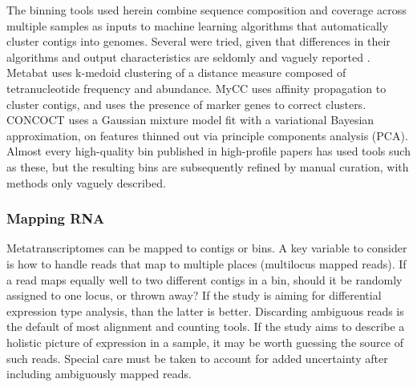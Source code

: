 The binning tools used herein combine sequence composition and coverage across multiple samples as inputs to machine learning algorithms that automatically cluster contigs into genomes.
Several were tried, given that differences in their algorithms and output characteristics are seldomly and vaguely reported \cite{sangwan2016}.
Metabat \cite{metabat2015} uses k-medoid clustering of a distance measure composed of tetranucleotide frequency and abundance.
MyCC \cite{mycc2016} uses affinity propagation to cluster contigs, and uses the presence of marker genes to correct clusters.
CONCOCT \cite{concoct2014} uses a Gaussian mixture model fit with a variational Bayesian approximation, on features thinned out via principle components analysis (PCA).
Almost every high-quality bin published in high-profile papers has used tools such as these, but the resulting bins are subsequently refined by manual curation, with methods only vaguely described.

\subsubsection{Mapping RNA}   %
Metatranscriptomes can be mapped to contigs or bins.
A key variable to consider is how to handle reads that map to multiple places (multilocus mapped reads).
If a read maps equally well to two different contigs in a bin, should it be randomly assigned to one locus, or thrown away?
If the study is aiming for differential expression type analysis, than the latter is better.
Discarding ambiguous reads is the default of most alignment and counting tools.
If the study aims to describe a holistic picture of expression in a sample, it may be worth guessing the source of such reads.
Special care must be taken to account for added uncertainty after including ambiguously mapped reads.


